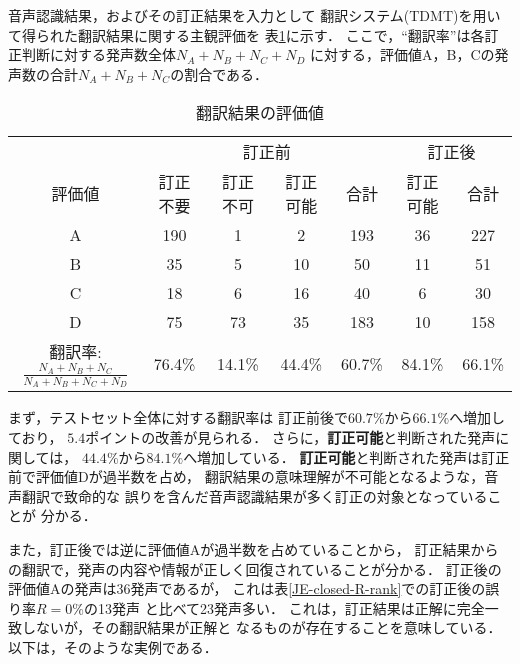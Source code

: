 音声認識結果，およびその訂正結果を入力として
翻訳システム(TDMT)を用いて得られた翻訳結果に関する主観評価を
表\ref{JE-closed-trans-rank}に示す．
ここで，``翻訳率''は各訂正判断に対する発声数全体$N_A+N_B+N_C+N_D$
に対する，評価値A，B，Cの発声数の合計$N_A+N_B+N_C$の割合である．

\begin{table}
\begin{center}
\caption{翻訳結果の評価値}
\label{JE-closed-trans-rank}
\begin{tabular}{|c||c|c|c||c||c||c|} \hline
 & \multicolumn{4}{c||}{訂正前} & \multicolumn{2}{c|}{訂正後}\\ \cline{2-7}
評価値 & 訂正不要 & 訂正不可 & 訂正可能 & 合計 & 訂正可能 & 合計 \\ \hline\hline
A & 190 & 1 & 2 & 193 & 36 & 227 \\ \hline
B & 35 & 5 & 10 & 50 & 11 & 51 \\ \hline
C & 18 & 6 & 16 & 40 & 6 & 30 \\ \hline
D & 75 & 73 & 35 & 183 & 10 & 158 \\ \hline\hline
翻訳率:$\frac{N_A+N_B+N_C}{N_A+N_B+N_C+N_D}$ & 76.4\% & 14.1\% & 44.4\% & 60.7\% & 84.1\% & 66.1\% \\ \hline
\end{tabular}
\end{center}
\end{table}

まず，テストセット全体に対する翻訳率は
訂正前後で$60.7\%$から$66.1\%$へ増加しており，
$5.4$ポイントの改善が見られる．
さらに，{\bf 訂正可能}と判断された発声に関しては，
$44.4\%$から$84.1\%$へ増加している．
{\bf 訂正可能}と判断された発声は訂正前で評価値Dが過半数を占め，
翻訳結果の意味理解が不可能となるような，音声翻訳で致命的な
誤りを含んだ音声認識結果が多く訂正の対象となっていることが
分かる．

また，訂正後では逆に評価値Aが過半数を占めていることから，
訂正結果からの翻訳で，発声の内容や情報が正しく回復されていることが分かる．
訂正後の評価値Aの発声は36発声であるが，
これは表\ref{JE-closed-R-rank}での訂正後の誤り率$R=0\%$の13発声
と比べて23発声多い．
これは，訂正結果は正解に完全一致しないが，その翻訳結果が正解と
なるものが存在することを意味している．
以下は，そのような実例である．

